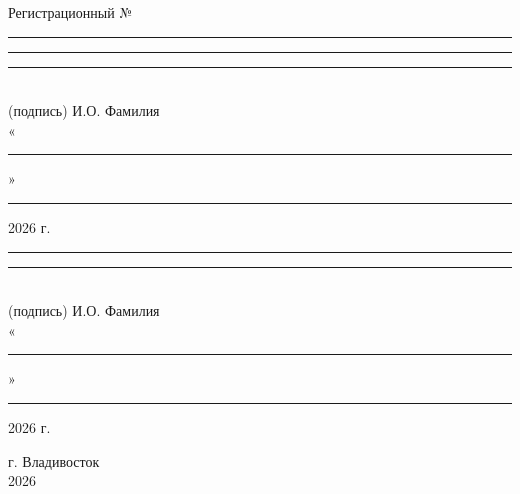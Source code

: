 \documentclass[a4paper,14pt]{extarticle}
\numberwithin{equation}{section}
\begin{document}
\begin{titlepage}
    \begin{flushleft}
        {\small Регистрационный № \rule{3.9cm}{0.1mm}}
    \end{flushleft}
    
    \begin{minipage}{0.46\textwidth}
        {\small
            \rule{2.5cm}{0.1mm} \hspace{0.1cm} \rule{4.85cm}{0.1mm} \\[-3.5mm]
            \hspace*{0.35cm} (подпись) \hspace*{2cm} И.О. Фамилия\\
            «\rule{1cm}{0.1mm}» \rule{5cm}{0.1mm} 2026 г.
        }
    \end{minipage}
    \hfill
    \begin{minipage}{0.5\textwidth}
        {\small
            \rule{2.5cm}{0.1mm} \hspace{0.1cm} \rule{5.77cm}{0.1mm} \\[-3.5mm]
            \hspace*{0.35cm} (подпись) \hspace*{2cm} И.О. Фамилия\\
            «\rule{1cm}{0.1mm}» \rule{5.7cm}{0.1mm} 2026 г.
        }
    \end{minipage}
    
    \vfill
    г. Владивосток\\
    2026
\end{titlepage}
\fancyhf{} %
\cfoot{\thepage} %
\setcounter{page}{2}


\end{document}
